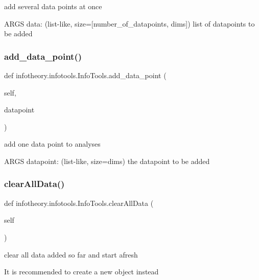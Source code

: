 \begin{DoxyVerb}add several data points at once

ARGS
data: (list-like, size=[number_of_datapoints, dims]) list of datapoints to be added
\end{DoxyVerb}
 \mbox{\label{classinfotheory_1_1infotools_1_1_info_tools_a56f38bf629e7a7831f3d0ee738df1077}} 
\subsubsection{\texorpdfstring{add\+\_\+data\+\_\+point()}{add\_data\_point()}}
{\footnotesize\ttfamily def infotheory.\+infotools.\+Info\+Tools.\+add\+\_\+data\+\_\+point (\begin{DoxyParamCaption}\item[{}]{self,  }\item[{}]{datapoint }\end{DoxyParamCaption})}

\begin{DoxyVerb}add one data point to analyses

ARGS
datapoint: (list-like, size=dims) the datapoint to be added
\end{DoxyVerb}
 \mbox{\label{classinfotheory_1_1infotools_1_1_info_tools_ab869cf9c1cfa0462dba819a52d040304}} 
\subsubsection{\texorpdfstring{clear\+All\+Data()}{clearAllData()}}
{\footnotesize\ttfamily def infotheory.\+infotools.\+Info\+Tools.\+clear\+All\+Data (\begin{DoxyParamCaption}\item[{}]{self }\end{DoxyParamCaption})}

\begin{DoxyVerb}clear all data added so far and start afresh

It is recommended to create a new object instead
\end{DoxyVerb}
 \mbox{\label{classinfotheory_1_1infotools_1_1_info_tools_afe2bba77e05df1103d38261748772a18}} 
